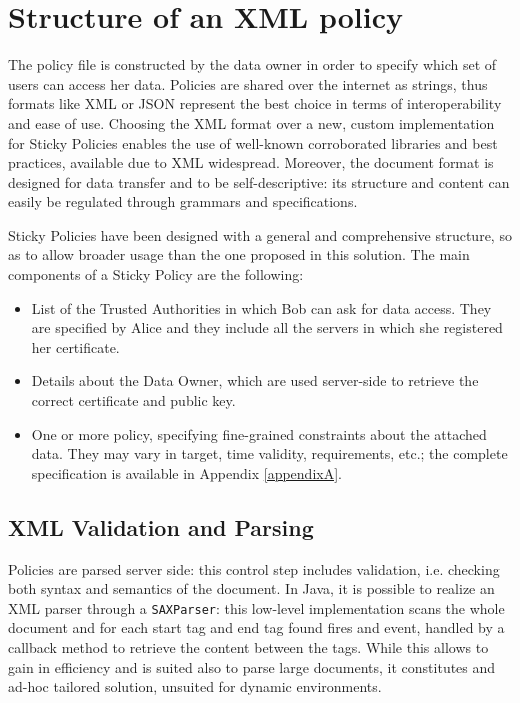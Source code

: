 \section{Structure of an XML policy}
The policy file is constructed by the data owner in order to specify which set of users can access her data. Policies are shared over the internet as strings, thus formats like XML or JSON represent the best choice in terms of interoperability and ease of use. Choosing the XML format over a new, custom implementation for Sticky Policies enables the use of well-known corroborated libraries and best practices, available due to XML widespread. Moreover, the document format is designed for data transfer and to be self-descriptive: its structure and content can easily be regulated through grammars and specifications.

Sticky Policies have been designed with a general and comprehensive structure, so as to allow broader usage than the one proposed in this solution. The main components of a Sticky Policy are the following:
\begin{itemize}
	\item List of the Trusted Authorities in which Bob can ask for data access. They are specified by Alice and they include all the servers in which she registered her certificate.
	\item Details about the Data Owner, which are used server-side to retrieve the correct certificate and public key.
	\item One or more policy, specifying fine-grained constraints about the attached data. They may vary in target, time validity, requirements, etc.; the complete specification is available in Appendix \ref{appendixA}.
\end{itemize}

\subsection{XML Validation and Parsing}
Policies are parsed server side: this control step includes validation, i.e. checking both syntax and semantics of the document. In Java, it is possible to realize an XML parser through a \texttt{SAXParser}: this low-level implementation scans the whole document and for each start tag and end tag found fires and event, handled by a callback method to retrieve the content between the tags. While this allows to gain in efficiency and is suited also to parse large documents, it constitutes and ad-hoc tailored solution, unsuited for dynamic environments.

